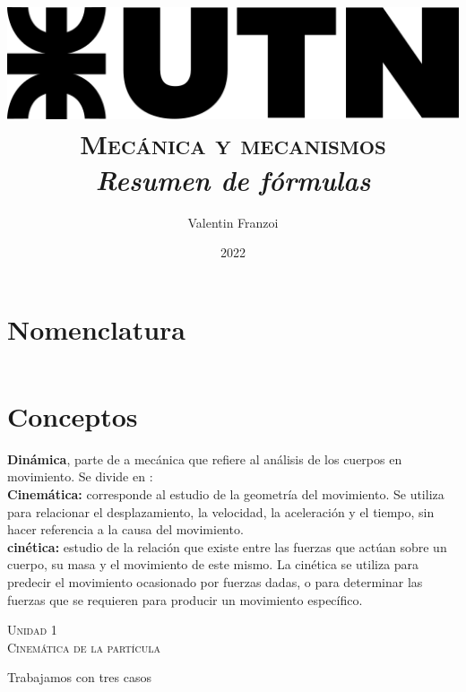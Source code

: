 \documentclass[11pt,a4paper,twocolumn]{article}
\author{Valentin Franzoi}
\title{\includegraphics[width=.3\textwidth]{utn} \\ \textsc{Mecánica y mecanismos} \\ \textsl{Resumen de fórmulas} \\ }
\date{2022}
\newcommand{\unidad}[2]{\begin{center}
		\fontsize{10}{10}\selectfont\color{gray!50!black}\scshape Unidad #1 \\
		\fontsize{14}{14}\selectfont \scshape #2
		
\end{center}}
\newcommand{\vc}[1]{\textbf{#1}}
\begin{document}
	\pagestyle{fancy}
	\maketitle
	\section*{Nomenclatura}
	
	\begin{tabular}{r l}	
		
	\end{tabular}

	\newpage
	
	\section*{Conceptos}	
	\noindent\textbf{Dinámica}, parte de a mecánica que refiere al análisis de los cuerpos en movimiento. Se divide en :\\
	\textbf{Cinemática:} corresponde al estudio de la geometría del movimiento. Se utiliza para relacionar el desplazamiento, la velocidad, la aceleración y el tiempo, sin hacer referencia a la causa del movimiento.\\
	\textbf{cinética:} estudio de la relación que existe entre las fuerzas que actúan sobre un cuerpo, su masa y el movimiento de este mismo. La cinética se utiliza para predecir el movimiento ocasionado por fuerzas dadas, o para determinar las fuerzas que se requieren para producir un movimiento específico.\\
	
\newpage

	
	\unidad{1}{Cinemática de la partícula}
	Trabajamos con tres casos
	
\end{document}
